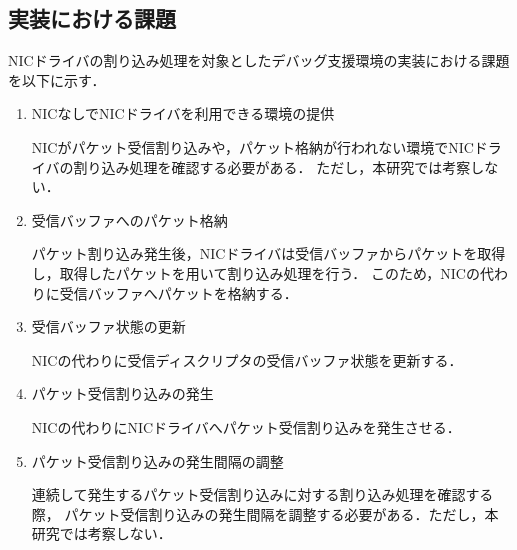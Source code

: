 \documentclass[12pt]{jsarticle}
\begin{document}

\subsection{実装における課題}
NICドライバの割り込み処理を対象としたデバッグ支援環境の実装における課題を以下に示す．
\begin{enumerate}
\item NICなしでNICドライバを利用できる環境の提供

NICがパケット受信割り込みや，パケット格納が行われない環境でNICドライバの割り込み処理を確認する必要がある．
ただし，本研究では考察しない．
\item 受信バッファへのパケット格納

パケット割り込み発生後，NICドライバは受信バッファからパケットを取得し，取得したパケットを用いて割り込み処理を行う．
このため，NICの代わりに受信バッファへパケットを格納する．
\item 受信バッファ状態の更新

NICの代わりに受信ディスクリプタの受信バッファ状態を更新する．
\item パケット受信割り込みの発生

NICの代わりにNICドライバへパケット受信割り込みを発生させる．
\item パケット受信割り込みの発生間隔の調整

連続して発生するパケット受信割り込みに対する割り込み処理を確認する際，
パケット受信割り込みの発生間隔を調整する必要がある．ただし，本研究では考察しない．
\end{enumerate}
\end{document}
